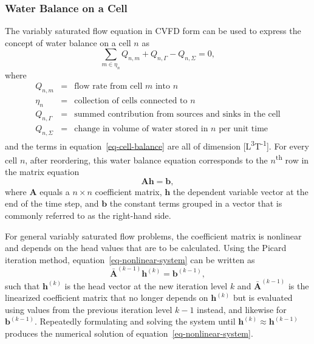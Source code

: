 \documentclass[fleqn]{article}
\begin{document}
\subsubsection*{Water Balance on a Cell}
The variably saturated flow equation in CVFD form can be used to
express the concept of water balance on a cell $n$ as
\begin{equation}
  \sum_{m \in \eta_n} Q_{n,m} + Q_{n, \Gamma} - Q_{n,\Sigma} = 0,
  \label{eq-cell-balance}
\end{equation}
where
\begin{eqnarray*}
  Q_{n,m} &=& \text{flow rate from cell $m$ into $n$} \\
  \eta_n &=& \text{collection of cells connected to $n$} \\
  Q_{n,\Gamma} &=& \text{summed contribution from sources and sinks in the cell} \\
  Q_{n,\Sigma} &=& \text{change in volume of water stored in $n$ per unit time}
\end{eqnarray*}
and the terms in equation~\ref{eq-cell-balance} are all of dimension
[L\textsuperscript{3}T\textsuperscript{-1}]. For every cell $n$, after
reordering, this water balance equation corresponds to the 
$n$\textsuperscript{th} row in the matrix equation
\begin{equation}
  \mathbf{A}\mathbf{h} = \mathbf{b},
  \label{eq-nonlinear-system}
\end{equation}
where $\mathbf{A}$ equals a $n \times n$ coefficient matrix, $\mathbf{h}$
the dependent variable vector at the end of the time step, and
$\mathbf{b}$ the constant terms grouped in a vector that is commonly
referred to as the right-hand side. 

For general variably saturated flow problems, the coefficient matrix is 
nonlinear and depends on the head values that are to be calculated. 
Using the Picard iteration method, equation~\ref{eq-nonlinear-system} 
can be written as
\begin{equation}
  \mathbf{\bar{A}}^{(k-1)} \mathbf{h}^{(k)} = \mathbf{b}^{(k-1)},
  \label{eq-linearized-system}
\end{equation}
such that $\mathbf{h}^{(k)}$ is the head vector at the new iteration level
$k$ and $\mathbf{\bar{A}}^{(k-1)}$ is the linearized coefficient matrix
that no longer depends on $\mathbf{h}^{(k)}$ but is evaluated using values
from the previous iteration level $k-1$ instead, and likewise for 
$\mathbf{b}^{(k-1)}$. Repeatedly formulating and solving the system until 
$\mathbf{h}^{(k)} \approx \mathbf{h}^{(k-1)}$ produces the numerical 
solution of equation~\ref{eq-nonlinear-system}.
\end{document}
